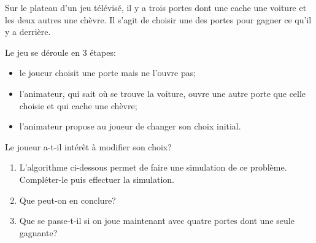 \begin{TP}
Sur le plateau d'un jeu télévisé, il y a trois portes dont une cache une
voiture et les deux autres une chèvre. Il s'agit de choisir une des portes pour gagner ce qu'il y a derrière.

Le jeu se déroule en 3 étapes:
\begin{itemize}
\item le joueur choisit une porte mais ne l'ouvre pas;
\item l'animateur, qui sait où se trouve la voiture, ouvre une autre porte que celle choisie et qui cache une chèvre;
\item l'animateur propose au joueur de changer son choix initial.
\end{itemize}
Le joueur a-t-il intérêt à modifier son choix?
\begin{enumerate}
\item L'algorithme ci-dessous permet de faire une simulation de ce
problème.\\ Compléter-le puis effectuer la simulation.
\begin{center}
\begin{algorithme}
\BLOCKvariables
{}
\BLOCKtraitements
{}
\BLOCKaffichage
{}
\finAlgo
\end{algorithme}
\end{center}
\item Que peut-on en conclure?
\item Que se passe-t-il si on joue maintenant avec quatre portes dont une
seule gagnante?
\end{enumerate}

\end{TP}



